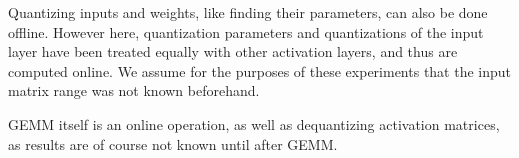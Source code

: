 Quantizing inputs and weights, like finding their parameters, can also be done offline. However here, quantization parameters and quantizations of the input layer have been treated equally with other activation layers, and thus are computed online. We assume for the purposes of these experiments that the input matrix range was not known beforehand.

GEMM itself is an online operation, as well as dequantizing activation matrices, as results are of course not known until after GEMM.